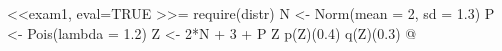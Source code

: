 <<exam1, eval=TRUE >>=
require(distr)
N <- Norm(mean = 2, sd = 1.3)
P <- Pois(lambda = 1.2)
Z <- 2*N + 3 + P
Z
p(Z)(0.4)
q(Z)(0.3)
@
